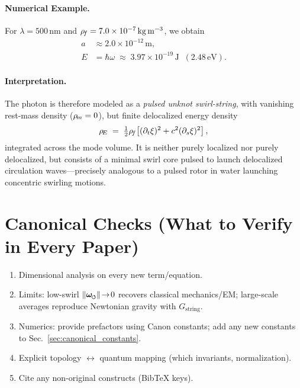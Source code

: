 \documentclass[11pt]{article}
\begin{document}
    \paragraph{Numerical Example.}
    For $\lambda = 500\,\mathrm{nm}$ and $\rho_{\!f} = 7.0 \times 10^{-7}\,\mathrm{kg\,m^{-3}}$,
    we obtain
    \begin{align}
    a &\approx 2.0 \times 10^{-12}\,\mathrm{m},\\
    E &= \hbar \omega \;\approx\; 3.97 \times 10^{-19}\,\mathrm{J}\;\; (2.48\,\mathrm{eV}).
    \end{align}

    \paragraph{Interpretation.}
    The photon is therefore modeled as a \emph{pulsed unknot swirl-string}, with vanishing rest-mass density ($\rho_{\!m}=0$), but finite delocalized energy density
    \begin{equation}
    \rho_{\!E} \;=\; \tfrac{1}{2}\rho_{\!f}\!\left[(\partial_t \xi)^2
    + c^2 (\partial_s \xi)^2\right],
    \end{equation}
    integrated across the mode volume.
    It is neither purely localized nor purely delocalized, but consists of a minimal swirl core pulsed to launch delocalized circulation waves---precisely analogous to a pulsed rotor in water launching concentric swirling motions.



    \section{Canonical Checks (What to Verify in Every Paper)}
    \begin{enumerate}
        \item Dimensional analysis on every new term/equation.
        \item Limits: low-swirl \(\lVert\omegas\rVert\!\to\!0\) recovers classical mechanics/EM; large-scale averages reproduce Newtonian gravity with \(G_{\text{string}}\).
        \item Numerics: provide prefactors using Canon constants; add any new constants to Sec.~\ref{sec:canonical_constants}.
        \item Explicit topology \(\leftrightarrow\) quantum mapping (which invariants, normalization).
        \item Cite any non-original constructs (BibTeX keys).
    \end{enumerate}
\end{document}
